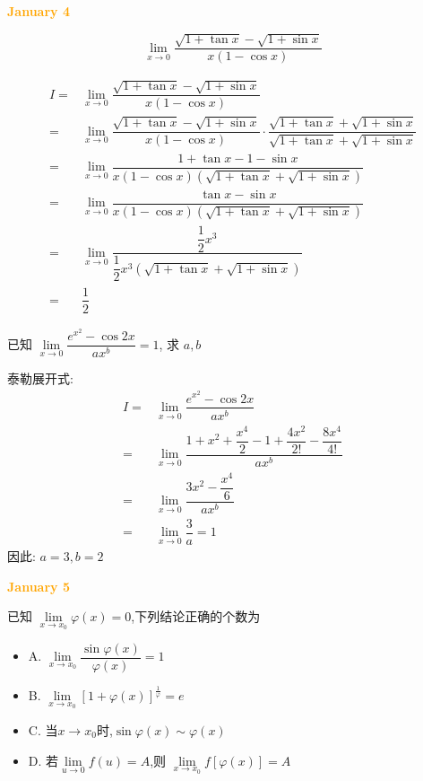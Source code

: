 \textcolor{orange}{\textbf{January 4}}

\begin{example}[][Exam: 27.1.12]
	$$\lim\limits_{x\to 0}\dfrac{\sqrt{1+\tan x}-\sqrt{1+\sin x}}{x(1-\cos x)}$$
\end{example}

\begin{solution}

	\begin{align*}
		I = & \lim\limits_{x\to 0}\dfrac{\sqrt{1+\tan x}-\sqrt{1+\sin x}}{x(1-\cos x)}\\
		  = & \lim\limits_{x\to 0}\dfrac{\sqrt{1+\tan x}-\sqrt{1+\sin x}}{x(1-\cos x)}\cdot \dfrac{\sqrt{1+\tan x}+\sqrt{1+\sin x}}{\sqrt{1+\tan x}+\sqrt{1+\sin x}}\\
		  = & \lim\limits_{x\to 0}\dfrac{1+\tan x-1-\sin x}{x(1-\cos x)(\sqrt{1+\tan x}+\sqrt{1+\sin x})}\\
		  = & \lim\limits_{x\to 0}\dfrac{\tan x-\sin x}{x(1-\cos x)(\sqrt{1+\tan x}+\sqrt{1+\sin x})}\\
		  = & \lim\limits_{x\to 0}\dfrac{\dfrac{1}{2}x^{3}}{\dfrac{1}{2}x^{3}(\sqrt{1+\tan x}+\sqrt{1+\sin x})}\\
		  = & \dfrac{1}{2}
	\end{align*}
\end{solution}

\begin{example}[][Exam: 27.1.13]
	已知 $\lim\limits_{x\to 0}\dfrac{e^{x^{2}}-\cos 2x}{ax^{b}}=1$, 求 $a,b$
\end{example}

\begin{solution}

	泰勒展开式:
	\begin{align*}
		I = & \lim\limits_{x\to 0}\dfrac{e^{x^{2}}-\cos 2x}{ax^{b}}\\
		  = & \lim\limits_{x\to 0}\dfrac{1+x^{2}+\dfrac{x^{4}}{2}-1+\dfrac{4x^{2}}{2!}-\dfrac{8x^{4}}{4!}}{ax^{b}}\\
		  = & \lim\limits_{x\to 0}\dfrac{3x^{2}-\dfrac{x^{4}}{6}}{ax^{b}}\\
		  = & \lim\limits_{x\to 0}\dfrac{3}{a} = 1
	\end{align*}
	因此: $a = 3, b = 2$
\end{solution}

\textcolor{orange}{\textbf{January 5}}

\begin{example}[][Exam: 27.1.14]
	已知 $\lim\limits_{x\to x_{0}}\varphi(x)=0$,下列结论正确的个数为
	\begin{itemize}
		\item A. $\lim\limits_{x\to x_{0}}\dfrac{\sin\varphi(x)}{\varphi(x)}=1$
		\item B. $\lim\limits_{x\to x_{0}}[1+\varphi(x)]^{\frac{1}{\varphi}}=e$
		\item C. 当$x\to x_{0}$时,$\sin \varphi(x)\sim \varphi(x)$
		\item D. 若$\lim\limits_{u\to 0}f(u)=A$,则 $\lim\limits_{x\to x_{0}}f[\varphi(x)]=A$
	\end{itemize}
\end{example}

